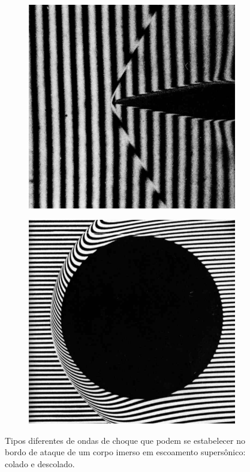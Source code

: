 \begin{figure}[htbp]
    \centering
    \begin{subfigure}{0.49\textwidth}
        \includegraphics[width=\textwidth]{img/attached_shock.png}
    \end{subfigure}
    \begin{subfigure}{0.49\textwidth}
        \includegraphics[width=\textwidth]{img/dettached_shock.png}
    \end{subfigure}
    \caption{Tipos diferentes de ondas de choque que podem se estabelecer no bordo de ataque de um corpo imerso em escoamento supersônico: colado e descolado.}\label{fig:shock_waves}
\end{figure}

